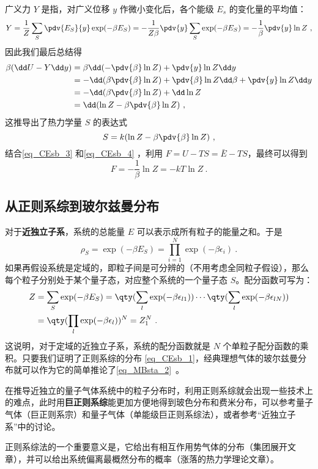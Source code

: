 广义力 $Y$ 是指，对广义位移 $y$ 作微小变化后，各个能级 $E_s$ 的变化量的平均值：
\begin{equation}
Y=\frac{1}{Z} \sum_S \pdv{E_S}{y} \exp(-\beta E_S)=-\frac{1}{Z\beta}\pdv{y} \sum_S\exp(-\beta E_S)=-\frac{1}{\beta} \pdv{y} \ln Z~,
\end{equation}
因此我们最后总结得
\begin{equation}
\begin{aligned}
\beta(\dd U-Y\dd y)&=\beta \dd (-\pdv{\beta} \ln Z)+\pdv{y} \ln Z\dd y\\
&= -\dd(\beta\pdv{\beta} \ln Z)+\pdv{\beta}\ln Z\dd \beta +\pdv{y} \ln Z\dd y\\
&= -\dd(\beta\pdv{\beta} \ln Z)+\dd \ln Z\\
&=\dd (\ln Z-\beta\pdv{\beta} \ln Z)~,
\end{aligned}
\end{equation}
这推导出了热力学量 $S$ 的表达式
\begin{equation}\label{eq_CEsb_4}
S=k(\ln Z-\beta\pdv{\beta}\ln Z)~,
\end{equation}
结合\autoref{eq_CEsb_3} 和\autoref{eq_CEsb_4} ，利用 $F=U-TS=\bar E-TS$，最终可以得到
\begin{equation}
F=-\frac{1}{\beta}\ln Z=-kT\ln Z~.
\end{equation}



\subsection{从正则系综到玻尔兹曼分布}
对于\textbf{近独立子系}，系统的总能量 $E$ 可以表示成所有粒子的能量之和。于是
\begin{equation}
\rho_S=\exp(-\beta E_S)=\prod_{i=1}^N\exp(-\beta\epsilon_i)~.
\end{equation}
如果再假设系统是定域的，即粒子间是可分辨的（不用考虑全同粒子假设），那么每个粒子分别处于某个量子态，对应整个系统的一个量子态 $S$。配分函数可写为：
\begin{equation}
\begin{aligned}
Z&=\sum_S\exp(-\beta E_S)=\qty(\sum_{l}\exp(-\beta\epsilon_{l1}))\cdots\qty(\sum_{l}\exp(-\beta\epsilon_{lN}))\\
&=\qty(\prod_{l}\exp(-\beta\epsilon_{l}))^N=Z_1^N~.
\end{aligned}
\end{equation}
这说明，对于定域的近独立子系，系统的配分函数就是 $N$ 个单粒子配分函数的乘积。只要我们证明了正则系综的分布 \autoref{eq_CEsb_1}，经典理想气体的玻尔兹曼分布就可以作为它的简单推论了\autoref{eq_MBsta_2}~。

在推导近独立的量子气体系统中的粒子分布时，利用正则系综就会出现一些技术上的难点，此时用\textbf{巨正则系综}能更加方便地得到玻色分布和费米分布，可以参考量子气体（巨正则系宗）和量子气体（单能级巨正则系综法），或者参考“近独立子系”中的讨论。

正则系综法的一个重要意义是，它给出有相互作用势气体的分布（集团展开文章），并可以给出系统偏离最概然分布的概率（涨落的热力学理论文章）。
